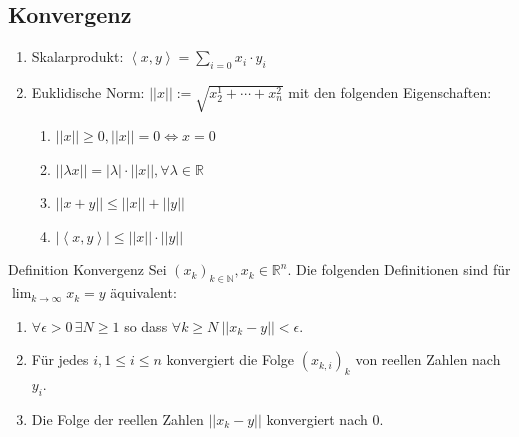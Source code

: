 \documentclass[a4paper,10pt]{article}
\def\R{\mathbb{R}}
\begin{document}
\subsection{Konvergenz}
\begin{enumerate}
  \item Skalarprodukt: \(\left< x,y\right> = \sum_{i=0} x_i \cdot y_i\)
  \item Euklidische Norm: \(||x|| := \sqrt{x_2^1 + \cdots + x_n^2}\) mit den folgenden Eigenschaften:
  \begin{enumerate}
    \item \(||x|| \ge 0, ||x|| = 0 \iff x = 0\)
    \item \(||\lambda x|| = |\lambda| \cdot ||x||, \forall \lambda \in \R\)
    \item \(||x+y|| \le ||x|| + ||y||\)
    \item \(|\left<x,y\right>| \le ||x|| \cdot ||y||\)
  \end{enumerate}
\end{enumerate}

\begin{mainbox}{Definition Konvergenz}
  Sei \((x_k)_{k \in \mathbb{N}}, x_k \in \R^n\). Die folgenden Definitionen sind für \(\lim_{k\to\infty}x_k = y\) äquivalent:
  \begin{enumerate}
    \item \(\forall \epsilon > 0\, \exists N \ge 1\) so dass \(\forall k \ge N \ ||x_k - y|| < \epsilon\).
    \item Für jedes \(i, 1 \le i \le n\) konvergiert die Folge \((x_{k,i})_k\) von reellen Zahlen nach \(y_i\).
    \item Die Folge der reellen Zahlen \(||x_k - y||\) konvergiert nach \(0\).
  \end{enumerate}
\end{mainbox}
\end{document}
